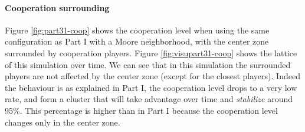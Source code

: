 \documentclass[letterpaper]{article}
\begin{document}
\paragraph{Cooperation surrounding}

\label{part31-coop}

Figure \ref{fig:part31-coop} shows
the cooperation level when using the same configuration as Part I
with a Moore neighborhood, with the center zone surrounded
by cooperation players. Figure \ref{fig:visupart31-coop} shows the
lattice of this simulation over time. We can see that in this simulation
the surrounded players are not affected by the center zone (except for the
closest players). Indeed the behaviour is as explained in Part I, the
cooperation level drops to a very low rate, and form a cluster that will
take advantage over time and \textit{stabilize} around 95\%. This percentage
is higher than in Part I because the cooperation level changes only
in the center zone.
\end{document}
